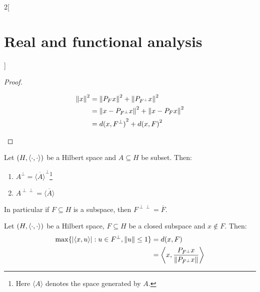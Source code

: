 \documentclass[../../../main_math.tex]{subfiles}
\begin{document}
\begin{multicols}{2}[\section{Real and functional analysis}]
\begin{proof}
\begin{enumerate}
\begin{align*}
              \left\|x\right\|^2 & =\left\|P_Fx\right\|^2+\left\|P_{F^\perp}x\right\|^2      \\
                         & =\left\|x -P_{F^\perp}x\right\|^2+\left\|x-P_Fx\right\|^2 \\
                         & ={d(x,F^\perp)}^2+{d(x,F)}^2
            \end{align*}
    \end{enumerate}
  \end{proof}
  \begin{proposition}
    Let $(H,{\left\langle\cdot,\cdot\right\rangle})$ be a Hilbert space and $A\subseteq H$ be subset. Then:
    \begin{enumerate}
      \item $\displaystyle A^\perp ={\overline{\langle A\rangle}}^\perp$\footnote{Here $\langle A\rangle$ denotes the space generated by $A$.}
      \item $\displaystyle A^{\perp\perp} ={\overline{\langle A\rangle}}$
    \end{enumerate}
    In particular if $F\subseteq H$ is a subspace, then $F^{\perp\perp} ={\overline{F}}$.
  \end{proposition}
  \begin{proposition}
    Let $(H,{\left\langle\cdot,\cdot\right\rangle})$ be a Hilbert space, $F\subseteq H$ be a closed subspace and $x\notin F$. Then:
    \begin{align*}
      \max\{\abs{{\left\langle x,u\right\rangle}}:u\in F^\perp, \left\|u\right\|\leq 1\} & =d(x, F)                                            \\
                                                             & ={\left\langle x,\frac{P_{F^\perp}x}{\left\|P_{F^\perp}x\right\|}\right\rangle}
    \end{align*}
  \end{proposition}

\end{multicols}
\end{document}
